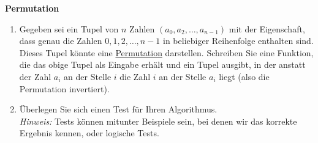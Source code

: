 \textbf{Permutation}
\begin{enumerate}
	\item Gegeben sei ein Tupel von $n$ Zahlen $(a_0, a_2, \dots, a_{n-1})$ mit der Eigenschaft, dass genau die Zahlen $0, 1, 2, \dots, n-1$ in beliebiger Reihenfolge enthalten sind. Dieses Tupel könnte eine \hyperref{https://de.wikipedia.org/wiki/Permutation#Definition}{}{}{Permutation} darstellen.	Schreiben Sie eine Funktion, die das obige Tupel als Eingabe erhält und ein Tupel ausgibt, in der anstatt der Zahl $a_i$ an der Stelle $i$ die Zahl $i$ an der Stelle $a_i$ liegt (also die Permutation invertiert). 
	\item Überlegen Sie sich einen Test für Ihren Algorithmus.\\
	\textit{Hinweis:} Tests können mitunter Beispiele sein, bei denen wir das korrekte Ergebnis kennen, oder logische Tests.
\end{enumerate}

